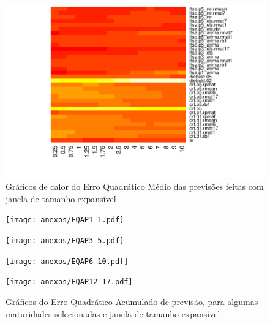 \documentclass[
	12pt,				%
	openright,			%
	oneside,			%
	a4paper,			%
	english,			%
	brazil				%
	]{dissertacao-ufrgs-abntex2}
\begin{document}
\begin{figure}[htp]
\begin{minipage}[t]{0.45\linewidth}
\begin{minipage}[t]{\linewidth}
    \end{minipage}
    \begin{minipage}[b]{\linewidth}
      \centering     \includegraphics[width=\textwidth]{anexos/heatmap12.pdf} 
    \end{minipage}
  \end{minipage}
  \caption{Gráficos de calor do Erro Quadrático Médio das previsões feitas com janela de tamanho expansível} 
  \label{fig:heatmaps}
\end{figure}

\begin{figure}[h!]
  \centering
  \begin{minipage}[t]{0.45\linewidth}
    \centering
    \begin{minipage}[t]{\linewidth}
      \centering     \texttt{[image: anexos/EQAP1-1.pdf]}
     
    \end{minipage}
    \begin{minipage}[b]{\linewidth}
      \centering     \texttt{[image: anexos/EQAP3-5.pdf]} 
    \end{minipage}
  \end{minipage}
  \begin{minipage}[t]{0.45\linewidth}
    \centering
    \begin{minipage}[t]{\linewidth}
      \centering     \texttt{[image: anexos/EQAP6-10.pdf]}
    \end{minipage}
    \begin{minipage}[b]{\linewidth}
      \centering     \texttt{[image: anexos/EQAP12-17.pdf]} 
    \end{minipage}
  \end{minipage}
  \caption{Gráficos do Erro Quadrático Acumulado de previsão, para algumas maturidades selecionadas e janela de tamanho expansível} 
  \label{fig:eqap}
\end{figure}
\end{document}
